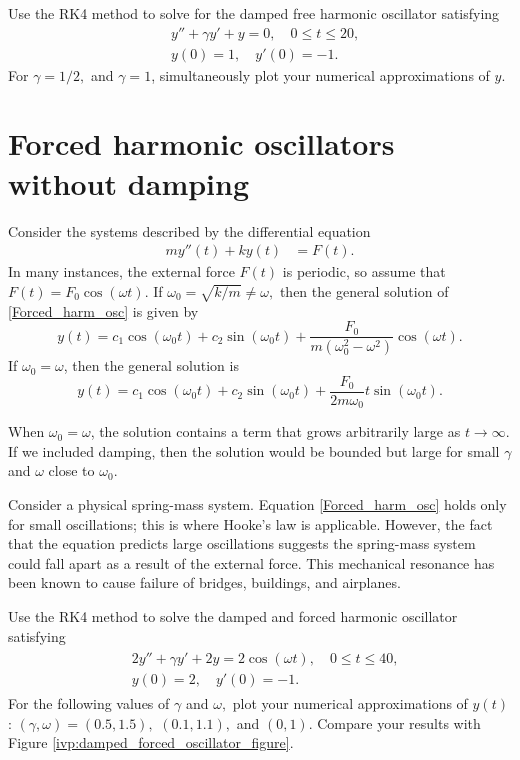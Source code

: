 \begin{problem}
Use the RK4 method to solve for the damped free harmonic oscillator satisfying 
\begin{align*}
&{}y'' +\gamma y'+ y = 0, \quad 0 \leq t \leq 20,\\
&{}y(0) = 1, \quad
y'(0) = -1.
\end{align*}
For $\gamma = 1/2,$ and $\gamma = 1$, simultaneously plot your numerical approximations of $y$.
\end{problem}

\section*{Forced harmonic oscillators without damping}
Consider the systems described by the differential equation
\begin{align}
my''(t)  + ky(t) &= F(t). \label{Forced_harm_osc}
\end{align}
In many instances, the external force $F(t)$ is periodic, so assume that $F(t) = F_0 \cos(\omega t)$. 
If $\omega_0 = \sqrt{k/m} \not = \omega,$ then the  general solution of \ref{Forced_harm_osc} is given by
\[y(t) = c_1 \cos (\omega_0 t) + c_2\sin (\omega_0 t) + \frac{F_0}{m(\omega_0^2 - \omega^2)} \cos (\omega t).\]
If $\omega_0 = \omega$, then the general solution is
\[y(t) = c_1 \cos (\omega_0 t) + c_2\sin (\omega_0 t) + \frac{F_0}{2m\omega_0} t \sin (\omega_0 t).\]

When $\omega_0 = \omega$, the solution contains a term that grows arbitrarily large as $t \to \infty$.
If we included damping, then the solution would be bounded but large for small $\gamma$ and $\omega$ close to $\omega_0$.

Consider a physical spring-mass system.
Equation \ref{Forced_harm_osc} holds only for small oscillations; this is where Hooke's law is applicable.
However, the fact that the equation predicts large oscillations suggests the spring-mass system could fall apart as a result of the external force. 
This mechanical resonance has been known to cause failure of bridges, buildings, and airplanes.

\begin{problem}
Use the RK4 method to solve the damped and forced harmonic oscillator satisfying 
\begin{align}
	\begin{split}
&{}2y'' + \gamma y' + 2y = 2 \cos (\omega t), \quad 0 \leq t \leq 40,\\
&{}y(0) = 2, \quad
y'(0) = -1. 
	\end{split}
	\label{ivp:damped_forced_oscillator}
\end{align}
For the following values of $\gamma$ and $\omega,$ plot your numerical approximations of $y(t)$: $(\gamma, \omega) = (0.5, 1.5),$ $(0.1, 1.1),$ and $(0, 1)$.
Compare your results with Figure \ref{ivp:damped_forced_oscillator_figure}.
\end{problem}


